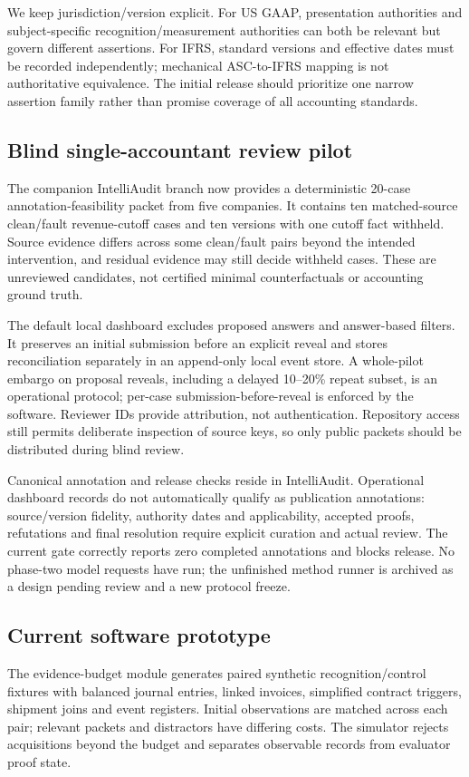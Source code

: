 \documentclass[11pt]{article}
\begin{document}
We keep jurisdiction/version explicit. For US GAAP, presentation authorities and subject-specific recognition/measurement authorities can both be relevant but govern different assertions. For IFRS, standard versions and effective dates must be recorded independently; mechanical ASC-to-IFRS mapping is not authoritative equivalence. The initial release should prioritize one narrow assertion family rather than promise coverage of all accounting standards.

\subsection{Blind single-accountant review pilot}
The companion IntelliAudit branch now provides a deterministic 20-case annotation-feasibility packet from five companies. It contains ten matched-source clean/fault revenue-cutoff cases and ten versions with one cutoff fact withheld. Source evidence differs across some clean/fault pairs beyond the intended intervention, and residual evidence may still decide withheld cases. These are unreviewed candidates, not certified minimal counterfactuals or accounting ground truth.

The default local dashboard excludes proposed answers and answer-based filters. It preserves an initial submission before an explicit reveal and stores reconciliation separately in an append-only local event store. A whole-pilot embargo on proposal reveals, including a delayed 10--20\% repeat subset, is an operational protocol; per-case submission-before-reveal is enforced by the software. Reviewer IDs provide attribution, not authentication. Repository access still permits deliberate inspection of source keys, so only public packets should be distributed during blind review.

Canonical annotation and release checks reside in IntelliAudit. Operational dashboard records do not automatically qualify as publication annotations: source/version fidelity, authority dates and applicability, accepted proofs, refutations and final resolution require explicit curation and actual review. The current gate correctly reports zero completed annotations and blocks release. No phase-two model requests have run; the unfinished method runner is archived as a design pending review and a new protocol freeze.

\subsection{Current software prototype}
The evidence-budget module generates paired synthetic recognition/control fixtures with balanced journal entries, linked invoices, simplified contract triggers, shipment joins and event registers. Initial observations are matched across each pair; relevant packets and distractors have differing costs. The simulator rejects acquisitions beyond the budget and separates observable records from evaluator proof state.
\end{document}
